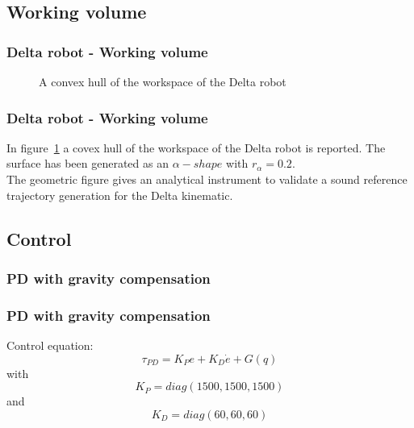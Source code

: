 \subsection{Working volume}
\begin{frame}
\frametitle{Delta robot - Working volume}
\begin{figure}
	\caption{A convex hull of the workspace of the Delta robot}
	\label{fig:Delta_WS}
\end{figure}
\end{frame}
%
\begin{frame}
\frametitle{Delta robot - Working volume}
In figure~\ref{fig:Delta_WS} a covex hull of the workspace of the Delta robot is reported. The surface has been generated as an $\alpha-shape$  with $r_\alpha = 0.2$.\\
The geometric figure gives an analytical instrument to validate a sound reference trajectory generation for the Delta kinematic.
\end{frame}
%
\subsection{Control}
\subsubsection{PD with gravity compensation}
\begin{frame}
\frametitle{PD with gravity compensation}
Control equation:
\begin{equation}
	\tau_{PD} = K_Pe + K_D\dot{e}+G(q)
\end{equation}
with
\[ K_P = diag(1500, 1500, 1500) \]
and
\[ K_D = diag(60, 60, 60) \]
\end{frame}
%
